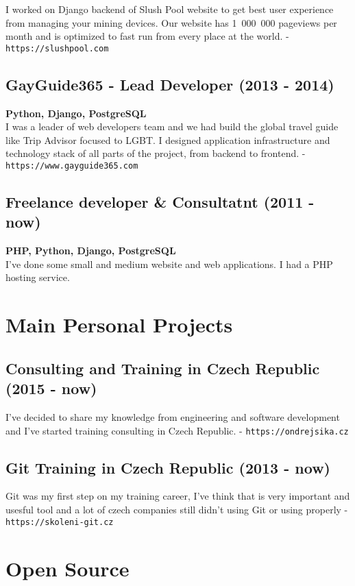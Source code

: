 \documentclass[12pt,a4paper]{article}
\begin{document}
I worked on Django backend of Slush Pool website to get best user experience from managing your mining devices. Our website has 1~000~000 pageviews per month and is optimized to fast run from every place at the world. - \texttt{https://slushpool.com}


\subsection*{GayGuide365 - Lead Developer (2013 - 2014)}
{\bf Python, Django, PostgreSQL}\\

I was a leader of web developers team and we had build the global travel guide like Trip Advisor focused to LGBT. I designed application infrastructure and technology stack of all parts of the project, from backend to frontend. - \texttt{https://www.gayguide365.com}


\subsection*{Freelance developer \& Consultatnt (2011 - now)}
{\bf PHP, Python, Django, PostgreSQL}\\

I've done some small and medium website and web applications. I had a PHP hosting service.

\section*{Main Personal Projects}

\subsection*{Consulting and Training in Czech Republic (2015 - now)}
 I've decided to share my knowledge from engineering and software development and I've started training consulting in Czech Republic. - \texttt{https://ondrejsika.cz}

\subsection*{Git Training in Czech Republic (2013 - now)}
Git was my first step on my training career, I've think that is very important and usesful tool and a lot of czech companies still didn't using Git or using properly - \texttt{https://skoleni-git.cz}

\section*{Open Source}
\end{document}
